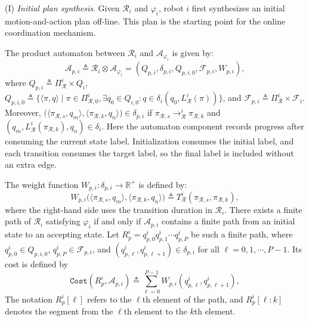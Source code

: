 (I) \emph{Initial plan synthesis}.
Given $\mathcal{R}_i$ and $\varphi_i$, robot $i$ first synthesizes an initial
motion-and-action plan off-line. This plan is the starting point for the online
coordination mechanism. 
\begin{revision}
The product automaton between $\mathcal{R}_i$ and
$\mathcal{A}_{\varphi_i}$ is given by:
\begin{equation}
\label{ch03:Ap}
\mathcal{A}_{p,i} \triangleq
\mathcal{R}_i \otimes \mathcal{A}_{\varphi_i}
= (Q_{p,i}, \delta_{p,i}, Q_{p,i,0}, \mathcal{F}_{p,i}, W_{p,i}),
\end{equation}
where
$Q_{p,i} \triangleq \Pi_{\mathcal{R}}^i \times Q_i$,
$Q_{p,i,0} \triangleq
\{\langle\pi,q\rangle\mid\allowbreak
\pi\in\Pi_{\mathcal{R},0}^i,\allowbreak
\exists q_0\in Q_{i,0}:\allowbreak
q\in\delta_i(q_0,L_{\mathcal{R}}^i(\pi))\}$, and
$\mathcal{F}_{p,i} \triangleq \Pi_{\mathcal{R}}^i \times \mathcal{F}_i$.
Moreover,
$\big(\langle \pi_{\mathcal{R},s},q_m \rangle,
\langle \pi_{\mathcal{R},k},q_n \rangle\big) \in \delta_{p,i}$
if
$\pi_{\mathcal{R},s} \longrightarrow_{\mathcal{R}}^i \pi_{\mathcal{R},k}$ and
$(q_m,L_{\mathcal{R}}^i(\pi_{\mathcal{R},k}),q_n) \in \delta_i$.
Here the automaton component records progress after consuming the current
state label. Initialization consumes the initial label, and each transition
consumes the target label, so the final label is included without an extra edge.
\end{revision}
The weight
function $W_{p,i} : \delta_{p,i} \rightarrow \mathbb{R}^+$ is defined by:
\begin{equation}
\label{ch03:eq:wp}
W_{p,i}\big(
\langle \pi_{\mathcal{R},s},q_m \rangle,
\langle \pi_{\mathcal{R},k},q_n \rangle
\big)
\triangleq
T_{\mathcal{R}}^i(\pi_{\mathcal{R},s},\pi_{\mathcal{R},k}),
\end{equation}
where the right-hand side uses the transition duration in $\mathcal{R}_i$.
There exists a finite path of $\mathcal{R}_i$ satisfying $\varphi_i$ if and
only if $\mathcal{A}_{p,i}$ contains a finite path from an initial state to an
accepting state. Let
${R}_{p}^i = q_{p,0}^i q_{p,1}^i \cdots q_{p,P}^i$
be such a finite path, where
$q_{p,0}^i \in Q_{p,i,0}$,
$q_{p,P}^i \in \mathcal{F}_{p,i}$, and
$(q_{p,\ell}^i,q_{p,\ell+1}^i) \in \delta_{p,i}$ for all
$\ell=0,1,\cdots,P-1$. Its cost is defined by
\begin{equation}
\label{ch03:eq:init-cost}
\texttt{Cost}(R_p^i,\mathcal{A}_{p,i}) \triangleq
\sum_{\ell=0}^{P-1} W_{p,i}(q_{p,\ell}^i,q_{p,\ell+1}^i),
\end{equation}
 The notation
$R_p^i[\ell]$ refers to the $\ell$th element of the path, and
$R_p^i[\ell\!:\!k]$ denotes the segment from the $\ell$th element to the $k$th
element.

